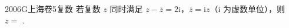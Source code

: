 
\begin{problem}{2006}{G}{上海卷}{5}{复数}
若复数 $ z $ 同时满足 $ z - \overline{z} = 2\mathrm{i} $，$ \overline{z} = \mathrm{i}z $（$ \mathrm{i} $ 为虚数单位），则 $ z = $ \underline{\hspace{4em}}.
\end{problem}

\begin{answer}

\end{answer}

\begin{solutions}

\end{solutions}
